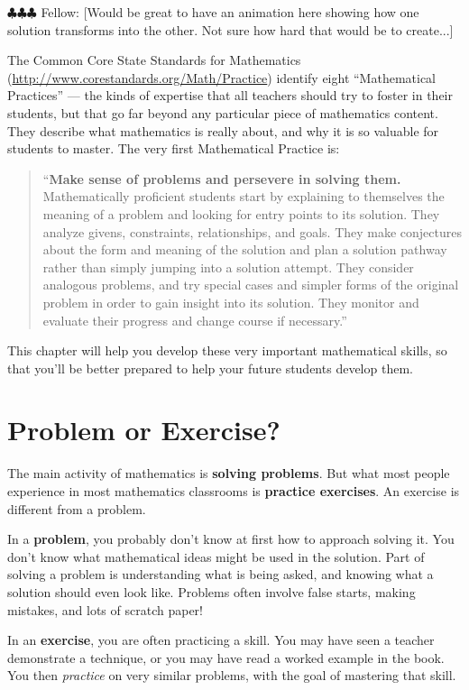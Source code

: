 \documentclass[10pt, reqno]{amsart}
\theoremstyle{remark}
\theoremstyle{definition}
\numberwithin{equation}{section}  %
\newcommand{\fellow}[1]{{\color{magenta} \sf $\clubsuit\clubsuit\clubsuit$ Fellow: [#1]}}
\begin{document}
\fellow{Would be great to have an animation here showing how one solution transforms into the other.  Not sure how hard that would be to create...}

The Common Core State Standards for Mathematics (\url{http://www.corestandards.org/Math/Practice}) identify eight ``Mathematical Practices'' --- the kinds of expertise that all teachers should try to foster in their students, but that go far beyond any particular piece of mathematics content.  They describe what mathematics is really about, and why it is so valuable for students to master.  The very first Mathematical Practice is:

\begin{quote}
``{\bf Make sense of problems and persevere in solving them.}\\
Mathematically proficient students start by explaining to themselves the meaning of a problem and looking for entry points to its solution. They analyze givens, constraints, relationships, and goals. They make conjectures about the form and meaning of the solution and plan a solution pathway rather than simply jumping into a solution attempt. They consider analogous problems, and try special cases and simpler forms of the original problem in order to gain insight into its solution. They monitor and evaluate their progress and change course if necessary.''
\end{quote}

This chapter will help you develop these very important mathematical skills, so that you'll be better prepared to help your future students develop them.


\section{Problem or Exercise?}
The main activity of mathematics is {\bf solving problems}.  But what most people experience in most mathematics classrooms is {\bf practice exercises}.  An exercise is different from a problem.


In a {\bf problem}, you probably don't know at first how to approach solving it.  You 
don't know what mathematical ideas might be used in the solution.  Part of solving a problem is understanding what is being asked, and knowing what a solution should even look like.  Problems often involve false starts, making mistakes, and lots of scratch paper!

In an {\bf exercise}, you are often practicing a skill.  You may have seen a teacher demonstrate a technique, or you may have read a worked example in the book.  You then \emph{practice} on very similar problems, with the goal of mastering that skill.
\end{document}

